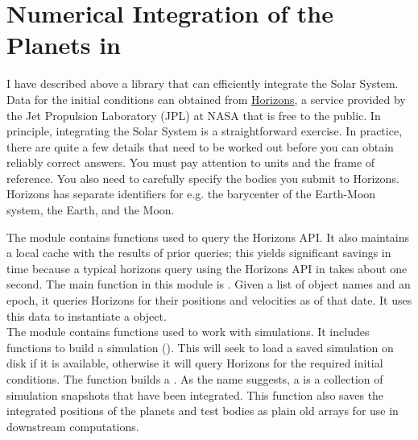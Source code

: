 \section{Numerical Integration of the Planets in }
\label{section_numerical_integration}
I have described above a library  that can efficiently integrate the Solar System.
Data for the initial conditions can obtained from \href{https://ssd.jpl.nasa.gov/?horizons}{Horizons},
a service provided by the Jet Propulsion Laboratory (JPL) at NASA that is free to the public.
In principle, integrating the Solar System is a straightforward exercise.
In practice, there are quite a few details that need to be worked out before you can obtain reliably correct answers.
You must pay attention to units and the frame of reference.
You also need to carefully specify the bodies you submit to Horizons.
Horizons has separate identifiers for e.g. the barycenter of the Earth-Moon system, the Earth, and the Moon.

The module  contains functions used to query the Horizons API.
It also maintains a local cache with the results of prior queries; 
this yields significant savings in time because a typical horizons query using the Horizons API in  takes about one second.
The main function in this module is .
Given a list of object names and an epoch, it queries Horizons for their positions and velocities as of that date.
It uses this data to instantiate a  object. \\
The module  contains functions used to work with  simulations.
It includes functions to build a simulation ().
This will seek to load a saved simulation on disk if it is available, otherwise it will query Horizons for the required initial conditions.
The function  builds a .
As the name suggests, a  is a collection of simulation snapshots that  have been integrated.
This function also saves the integrated positions of the planets and test bodies as plain old  arrays for use in downstream computations.


